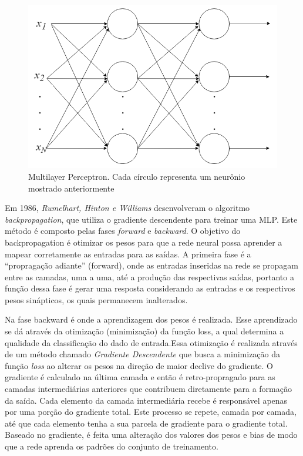 \begin{figure}[h]
	\centering
	\includegraphics[scale=0.4]{pasta1_figuras/mlp.png}
	\caption{Multilayer Perceptron. Cada círculo representa um neurônio mostrado anteriormente}
	\label{fig-mlp}
\end{figure}

Em 1986, \textit{Rumelhart, Hinton e Williams} \cite{hinton1986} desenvolveram o algoritmo \textit{backpropagation}, que utiliza o gradiente descendente para treinar uma MLP. Este método é composto pelas fases \textit{forward} e \textit{backward}. O objetivo do backpropagation é otimizar os pesos para que a rede neural possa aprender a mapear corretamente as entradas para as saídas. A primeira fase é a ``propragação adiante'' (forward), onde as entradas inseridas na rede se propagam entre as camadas, uma a uma, até a produção das respectivas saídas, portanto a função dessa fase é gerar uma resposta considerando as entradas e os respectivos pesos sinápticos, os quais permanecem inalterados.

Na fase backward é onde a aprendizagem dos pesos é realizada. Esse aprendizado se dá através da otimização (minimização) da função loss, a qual determina a qualidade da classificação do dado de entrada.Essa otimização é realizada através de um método chamado \textit{Gradiente Descendente} que busca a minimização da função \textit{loss} ao alterar os pesos na direção de maior declive do gradiente. O gradiente é calculado na última camada e então é retro-propragado para as camadas intermediárias anteriores que contribuem diretamente para a formação da saída. Cada elemento da camada intermediária recebe é responsável apenas por uma porção do gradiente total. Este processo se repete, camada por camada, até que cada elemento tenha a sua parcela de gradiente para o gradiente total. Baseado no gradiente, é feita uma alteração dos valores dos pesos e bias de modo que a rede aprenda os padrões do conjunto de treinamento.


